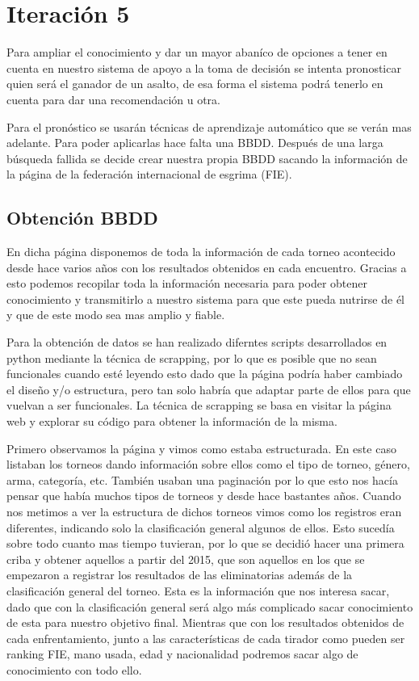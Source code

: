 \section{Iteración 5}


Para ampliar el conocimiento y dar un mayor abaníco de opciones
a tener en cuenta en nuestro sistema de apoyo a la toma de decisión
se intenta pronosticar quien será el ganador de un asalto, de esa forma
el sistema podrá tenerlo en cuenta para dar una recomendación u otra.


Para el pronóstico se usarán técnicas de aprendizaje automático que se
verán mas adelante. Para poder aplicarlas hace falta una BBDD. Después de
una larga búsqueda fallida se decide crear nuestra propia BBDD sacando
la información de la página de la federación internacional de esgrima (FIE).

\subsection{Obtención BBDD}

En dicha página disponemos de toda la información de cada torneo acontecido
desde hace varios años con los resultados obtenidos en cada encuentro. Gracias
a esto podemos recopilar toda la información necesaria para poder obtener conocimiento
y transmitirlo a nuestro sistema para que este pueda nutrirse de él y que de este
modo sea mas amplio y fiable.

Para la obtención de datos se han realizado diferntes scripts desarrollados en
python mediante la técnica de scrapping, por lo que es posible que no sean funcionales
cuando esté leyendo esto dado que la página podría haber cambiado el diseño y/o
estructura, pero tan solo habría que adaptar parte de ellos para que vuelvan a
ser funcionales. La técnica de scrapping se basa en visitar la página web y
explorar su código para obtener la información de la misma.

Primero observamos la página y vimos como estaba estructurada. En este caso listaban
los torneos dando información sobre ellos como el tipo de torneo, género, arma, categoría,
etc. También usaban una paginación por lo que esto nos hacía pensar que había muchos tipos
de torneos y desde hace bastantes años. Cuando nos metimos a ver la estructura de dichos torneos
vimos como los registros eran diferentes, indicando solo la clasificación general algunos de ellos.
Esto sucedía sobre todo cuanto mas tiempo tuvieran, por lo que se decidió hacer una primera
criba y obtener aquellos a partir del 2015, que son aquellos en los que se empezaron a registrar
los resultados de las eliminatorias además de la clasificación general del torneo. Esta es la
información que nos interesa sacar, dado que con la clasificación general será algo más
complicado sacar conocimiento de esta para nuestro objetivo final. Mientras que con los
resultados obtenidos de cada enfrentamiento, junto a las características de cada tirador
como pueden ser ranking FIE, mano usada, edad y nacionalidad podremos sacar algo de
conocimiento con todo ello.

